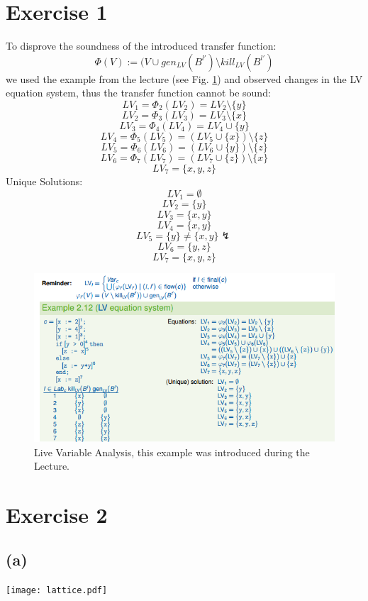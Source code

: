 \documentclass[fleqn,12pt]{article}
\begin{document}
\section*{Exercise 1}
To disprove the soundness of the introduced transfer function:
$$\Phi (V) := (V \cup gen_{LV}(B^{l'}) \setminus  kill_{LV}(B^{l'})$$
we used the example from the lecture (see Fig. \ref{fig:lecEx}) and observed changes in the LV equation system, thus the transfer function cannot be sound:
$$LV_1 = \Phi_2(LV_2) = LV_2 \setminus \{ y \}$$
$$LV_2 = \Phi_3(LV_3) = LV_3 \setminus \{ x \}$$
$$LV_3 = \Phi_4(LV_4) = LV_4 \cup \{ y \}$$
$$LV_4 = \Phi_5(LV_5) =( LV_5 \cup \{ x \}) \setminus \{ z \}$$
$$LV_5 = \Phi_6(LV_6) =( LV_6 \cup \{ y \}) \setminus \{ z \}$$
$$LV_6 = \Phi_7(LV_7) =( LV_7 \cup \{ z \}) \setminus \{ x \}$$
$$LV_7 = \{x,y,z\}$$
Unique Solutions:
$$LV_1 = \emptyset$$
$$LV_2 =  \{ y \}$$
$$LV_3 =  \{ x, y \}$$
$$LV_4 =  \{ x, y \}$$
$$LV_5 =  \{  y \} \neq \{ x, y \} \lightning$$
$$LV_6 =  \{  y, z \}$$
$$LV_7 =  \{  x, y, z \}$$
\begin{figure}[!htb]
\includegraphics[width=\textwidth,keepaspectratio]{LectureExample.png}
\caption{Live Variable Analysis, this example was introduced during the Lecture.}
\label{fig:lecEx}
\end{figure}
\section*{Exercise 2}
\subsection*{(a)}
\texttt{[image: lattice.pdf]}
\end{document}

